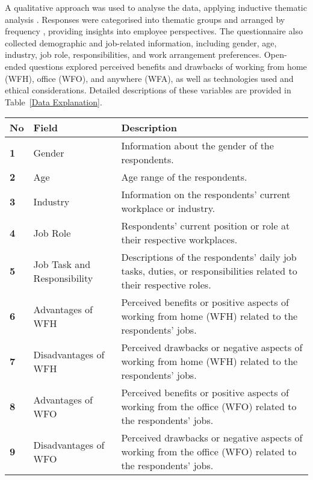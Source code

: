 \documentclass[a4paper, conference]{IEEEtran}
\begin{document}
A qualitative approach was used to analyse the data, applying inductive thematic analysis \cite{hamilton2019qualitative,kumar2018qualitative}. Responses were categorised into thematic groups and arranged by frequency \cite{seixas2018qualitative,turale2020brief}, providing insights into employee perspectives. The questionnaire also collected demographic and job-related information, including gender, age, industry, job role, responsibilities, and work arrangement preferences. Open-ended questions explored perceived benefits and drawbacks of working from home (WFH), office (WFO), and anywhere (WFA), as well as technologies used and ethical considerations. Detailed descriptions of these variables are provided in Table~\ref{Data Explanation}.


\begin{table*}[ht]
	\centering
	\caption{Description of Data Fields}
	\label{Data Explanation}
	\begin{tabular}{|p{}|p{}|p{}|}
		\hline
		\textbf{No} & \textbf{Field} & \textbf{Description} \\ 
		\hline
		\textbf{1} & Gender & Information about the gender of the respondents. \\ 
		\hline
		\textbf{2} & Age & Age range of the respondents. \\ 
		\hline
		\textbf{3} & Industry & Information on the respondents' current workplace or industry. \\ 
		\hline
		\textbf{4} & Job Role & Respondents' current position or role at their respective workplaces. \\ 
		\hline
		\textbf{5} & Job Task and Responsibility & Descriptions of the respondents' daily job tasks, duties, or responsibilities related to their respective roles. \\ 
		\hline
		\textbf{6} & Advantages of WFH & Perceived benefits or positive aspects of working from home (WFH) related to the respondents' jobs. \\ 
		\hline
		\textbf{7} & Disadvantages of WFH & Perceived drawbacks or negative aspects of working from home (WFH) related to the respondents' jobs. \\ 
		\hline
		\textbf{8} & Advantages of WFO & Perceived benefits or positive aspects of working from the office (WFO) related to the respondents' jobs. \\ 
		\hline
		\textbf{9} & Disadvantages of WFO & Perceived drawbacks or negative aspects of working from the office (WFO) related to the respondents' jobs. \\ 

\end{tabular}
\end{table*}
\end{document}
